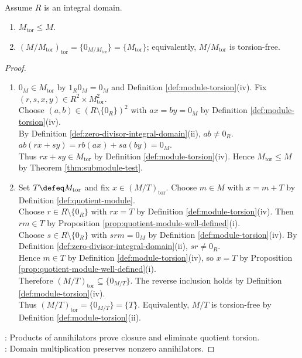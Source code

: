 \begin{proposition} \label{prop:torsion-submodule-over-domain} \\
Assume $R$ is an integral domain.
\begin{enumerate}[label=(\roman*)]
\setlength{\itemsep}{0pt}
\item $M_{\operatorname{tor}}\leq M$.
\item $(M/M_{\operatorname{tor}})_{\operatorname{tor}}=\{0_{M/M_{\operatorname{tor}}}\}=\{M_{\operatorname{tor}}\}$; equivalently, $M/M_{\operatorname{tor}}$ is torsion-free.
\end{enumerate}
\begin{proof}
\begin{enumerate}[label=(\roman*)]
\setlength{\itemsep}{0pt}
\item $0_M\in M_{\operatorname{tor}}$ by $1_R0_M=0_M$ and Definition \ref{def:module-torsion}(iv). Fix $(r,s,x,y)\in R^2\times M_{\operatorname{tor}}^2$.\\
Choose $(a,b)\in(R\setminus\{0_R\})^2$ with $ax=by=0_M$ by Definition \ref{def:module-torsion}(iv).\\
By Definition \ref{def:zero-divisor-integral-domain}(ii), $ab\neq0_R$. $ab(rx+sy)=rb(ax)+sa(by)=0_M$.\\
Thus $rx+sy\in M_{\operatorname{tor}}$ by Definition \ref{def:module-torsion}(iv). Hence $M_{\operatorname{tor}}\leq M$ by Theorem \ref{thm:submodule-test}.
\item Set $T\defeq M_{\operatorname{tor}}$ and fix $x\in(M/T)_{\operatorname{tor}}$. Choose $m\in M$ with $x=m+T$ by Definition \ref{def:quotient-module}.\\
Choose $r\in R\setminus\{0_R\}$ with $rx=T$ by Definition \ref{def:module-torsion}(iv). Then $rm\in T$ by Proposition \ref{prop:quotient-module-well-defined}(i).\\
Choose $s\in R\setminus\{0_R\}$ with $srm=0_M$ by Definition \ref{def:module-torsion}(iv). By Definition \ref{def:zero-divisor-integral-domain}(ii), $sr\neq0_R$.\\
Hence $m\in T$ by Definition \ref{def:module-torsion}(iv), so $x=T$ by Proposition \ref{prop:quotient-module-well-defined}(i).\\
Therefore $(M/T)_{\operatorname{tor}}\subseteq\{0_{M/T}\}$. The reverse inclusion holds by Definition \ref{def:module-torsion}(iv).\\
Thus $(M/T)_{\operatorname{tor}}=\{0_{M/T}\}=\{T\}$. Equivalently, $M/T$ is torsion-free by Definition \ref{def:module-torsion}(ii).
\end{enumerate}
: Products of annihilators prove closure and eliminate quotient torsion.\\
: Domain multiplication preserves nonzero annihilators.
\end{proof}
\end{proposition}

